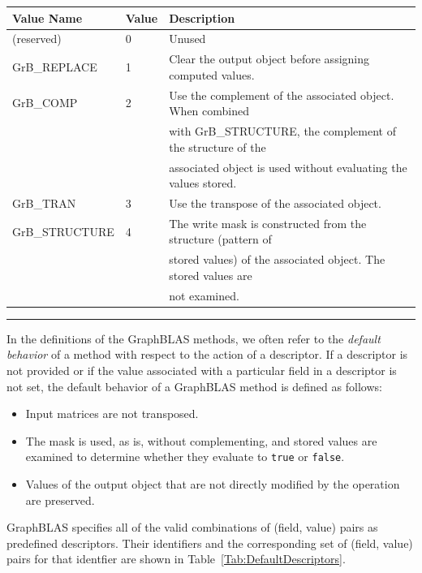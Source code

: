 \begin{table}
\begin{center}
\begin{tabular}{l|l|l}
Value Name           & Value  & Description \\ \hline
(reserved)           & 0      & Unused \\ 
{\sf GrB\_REPLACE}   & 1      & Clear the output object before assigning computed values.\\
{\sf GrB\_COMP}      & 2      & Use the complement of the associated object. When combined \\ 
                     &        & with {\sf GrB\_STRUCTURE}, the complement of the structure of the \\
                     &        & associated object is used without evaluating the values stored. \\
{\sf GrB\_TRAN}      & 3      &  Use the transpose of the associated object.\\
{\sf GrB\_STRUCTURE} & 4      & The write mask is constructed from the structure (pattern of \\
                     &        & stored values) of the associated object. The stored values are \\
                     &        & not examined.\\
\end{tabular}
\end{center}
\hrule
\end{table}

In the definitions of the GraphBLAS methods, we often refer to the
\emph{default behavior} of a method with respect to the action of a
descriptor.   If a descriptor is not provided or if the value associated
with a particular field in a descriptor is not set, the default behavior
of a GraphBLAS method is defined as follows:
\begin{itemize}
\item Input matrices are not transposed.
\item The mask is used, as is, without complementing, and stored values are examined to 
determine whether they evaluate to {\tt true} or {\tt false}.

\item Values of the output object that are not directly modified by the operation are preserved.
\end{itemize}

GraphBLAS specifies all of the valid combinations of (field, value) pairs as 
predefined descriptors. Their identifiers and the corresponding set of 
(field, value) pairs for that identfier are shown in 
Table~\ref{Tab:DefaultDescriptors}.

